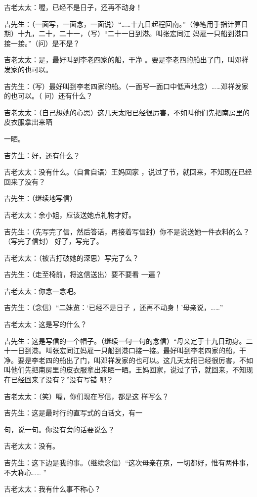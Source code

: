 \documentclass{article}
\begin{document}
吉老太太：喔，已经不是日子，还再不动身！
 

吉先生：（一面写，一面念，一面说）“……十九日起程回南。”（停笔用手指计算日期）十九，二十，二十一，（写）“二十一日到港。叫张宏同江
妈雇一只船到港口接一接。”（问）是不是？ 

吉老太太：是，最好叫到李老四家的船，干净
。要是李老四的船出了门，叫邓祥发家的也可以。 

吉先生：（写）最好叫到李老四家的船。（一面写一面口中低声地念）……邓祥发家的也可以。（
问）还有什么？ 

吉老太太：（自己想她的心思）这几天太阳已经很厉害，不如叫他们先把南房里的皮衣服拿出来晒
\newpage

一晒。 


吉先生：好，还有什么？ 

吉老太太：没有什么。（自言自语）王妈回家
，说过了节，就回来，不知现在已经回来了没有？ 


吉先生：（继续地写信） 


吉老太太：余小姐，应该送她点礼物才好。 

吉先生：（先写完了信，然后答话，再接着写信封）你不是说送她一件衣料的么？（写完了信封）
好了，写完了。 

吉老太太：（被吉打破她的深思）写完了么？

吉先生：（走至椅前，将这信送出）要不要看
一遍？ 


\newpage

吉老太太：你念一念吧。 

吉先生：（念信）“二妹览：‘已经不是日子
，还再不动身！’母亲说，……” 


吉老太太：这是写的什么？ 

吉先生：这是写信的一个帽子。（继续一句一句的念信）“母亲定于十九日动身。二十一日到港。叫张宏同江妈雇一只船到港口接一接。最好叫到李老四家的船，干净。要是李老四的船出了门，叫邓祥发家的也可以。这几天太阳已经很厉害，不如叫他们先把南房里的皮衣服拿出来晒一晒。王妈回家，说过了节，就回来，不知现在已经回来了没有？”没有写错
吧？ 


 

吉老太太：（笑）喔，你们现在写信，都是这
样写么？ 

吉先生：这是最时行的直写式的白话文，有一
\newpage

句，说一句。你没有旁的话要说么？ 


吉老太太：没有。 

吉先生：这下边是我的事。（继续念信）“这次母亲在京，一切都好，惟有两件事，不大称心……
” 


吉老太太：我有什么事不称心？ 
\end{document}
